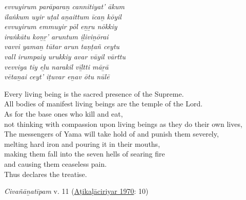 \begin{pullquote}\raggedright
      \emph{evvuyirum parāparaṉ cannitiyat’ ākum}\\
\emph{ilaṅkum uyir uṭal aṉaittum īcaṉ kōyil}\\
\emph{evvuyirum emmuyir pōl eṉṟu nōkkiy}\\
\emph{iraṅkātu koṉṟ’ aruntum iḻiviṉōrai}\\
\emph{vavvi yamaṉ tūtar arun taṇṭañ ceytu}\\
\emph{vall irumpaiy urukkiy avar vāyil vārttu}\\
\emph{vevviya tīy eḻu narakil vīḻtti māṟā}\\
\emph{vētaṉai ceyt’ iṭuvar eṉav ōtu nūlē}
\end{pullquote}
      
\begin{pullquote}


	
	    Every living being is the sacred presence of the Supreme.\\
	    All bodies of manifest living beings are the temple of the Lord.\\
	    As for the base ones who kill and eat,\\
	    not thinking with compassion upon living beings as they do their own lives,\\
	    The messengers of Yama will take hold of and punish them severely,\\
	    melting hard iron and pouring it in their mouths,\\
	    making them fall into the seven hells of searing fire\\
	    and causing them ceaseless pain.\\
	    Thus declares the treatise. 
	  \\


\medskip\hfill\begin{minipage}{0.9\textwidth}\small\hfill
\emph{Civañāṉatīpam} v. 11 (\hyperref[Atikalaciriyar1970]{Aṭikaḷāciriyar 1970}: 10)\end{minipage}\hspace{2em}
\end{pullquote}

